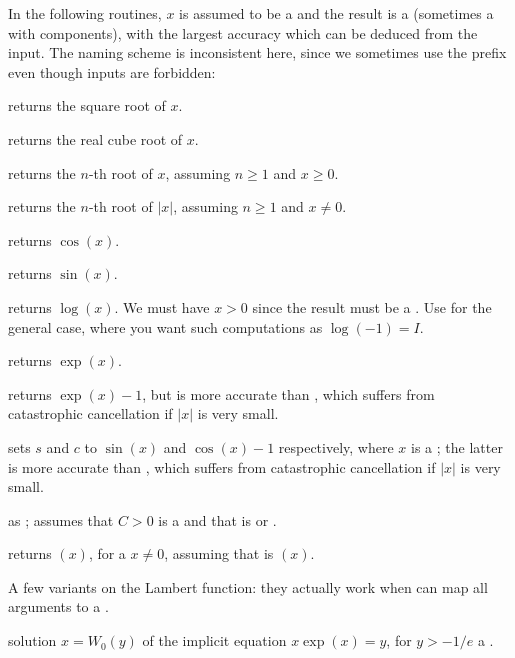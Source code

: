 
In the following routines, $x$ is assumed to be a  and the result
is a  (sometimes a  with  components), with
the largest accuracy which can be deduced from the input. The naming scheme
is inconsistent here, since we sometimes use the prefix  even though
 inputs are forbidden:

 returns the square root of $x$.

 returns the real cube root of $x$.

 returns the $n$-th root of $x$, assuming
$n\geq 1$ and $x \geq 0$.

 returns the $n$-th root of $|x|$,
assuming $n\geq 1$ and $x \neq 0$.

 returns $\cos(x)$.

 returns $\sin(x)$.

 returns $\log(x)$. We must have $x > 0$
since the result must be a . Use  for the general case,
where you want such computations as $\log(-1) = I$.

 returns $\exp(x)$.

 returns $\exp(x)-1$, but is more accurate than
, which suffers from catastrophic cancellation if
$|x|$ is very small.

 sets $s$ and $c$ to
$\sin(x)$ and $\cos(x)-1$ respectively, where $x$ is a ; the latter
is more accurate than , which suffers from
catastrophic cancellation if $|x|$ is very small.

 as ; assumes
that $C > 0$ is a  and that  is  or .

 returns $(x)$, for a 
$x\neq 0$, assuming that  is $(x)$.

\noindent A few variants on the Lambert function: they actually work when
 can map all  arguments to a .

 solution $x = W_0(y)$ of the implicit equation
$x \exp(x) = y$, for $y > -1/e$ a .


